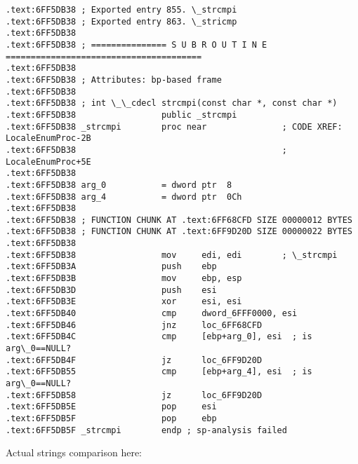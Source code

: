 \begin{lstlisting}[style=customasmx86]
.text:6FF5DB38 ; Exported entry 855. \_strcmpi
.text:6FF5DB38 ; Exported entry 863. \_stricmp
.text:6FF5DB38
.text:6FF5DB38 ; =============== S U B R O U T I N E =======================================
.text:6FF5DB38
.text:6FF5DB38 ; Attributes: bp-based frame
.text:6FF5DB38
.text:6FF5DB38 ; int \_\_cdecl strcmpi(const char *, const char *)
.text:6FF5DB38                 public _strcmpi
.text:6FF5DB38 _strcmpi        proc near               ; CODE XREF: LocaleEnumProc-2B
.text:6FF5DB38                                         ; LocaleEnumProc+5E
.text:6FF5DB38
.text:6FF5DB38 arg_0           = dword ptr  8
.text:6FF5DB38 arg_4           = dword ptr  0Ch
.text:6FF5DB38
.text:6FF5DB38 ; FUNCTION CHUNK AT .text:6FF68CFD SIZE 00000012 BYTES
.text:6FF5DB38 ; FUNCTION CHUNK AT .text:6FF9D20D SIZE 00000022 BYTES
.text:6FF5DB38
.text:6FF5DB38                 mov     edi, edi        ; \_strcmpi
.text:6FF5DB3A                 push    ebp
.text:6FF5DB3B                 mov     ebp, esp
.text:6FF5DB3D                 push    esi
.text:6FF5DB3E                 xor     esi, esi
.text:6FF5DB40                 cmp     dword_6FFF0000, esi
.text:6FF5DB46                 jnz     loc_6FF68CFD
.text:6FF5DB4C                 cmp     [ebp+arg_0], esi  ; is arg\_0==NULL?
.text:6FF5DB4F                 jz      loc_6FF9D20D
.text:6FF5DB55                 cmp     [ebp+arg_4], esi  ; is arg\_0==NULL?
.text:6FF5DB58                 jz      loc_6FF9D20D
.text:6FF5DB5E                 pop     esi
.text:6FF5DB5F                 pop     ebp
.text:6FF5DB5F _strcmpi        endp ; sp-analysis failed
\end{lstlisting}

Actual strings comparison here:

